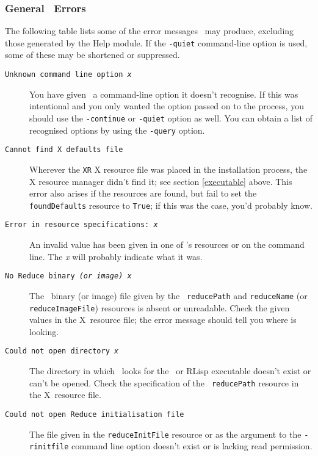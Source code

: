 \subsubsection{General \xr\ Errors}

The following table lists some of the error messages \xr\ may produce,
excluding those generated by the Help module. If the {\tt -quiet}
command-line option is used, some of these may be shortened or
suppressed.

\begin{description}

\item[{\tt Unknown command line option~{\it x\/}}]\hskip 0.6pc\relax
You have given \xr\ a command-line option it doesn't recognise.  If
this was intentional and you only wanted the option passed on to the
\REDUCE{} process, you should use the {\tt -continue} or {\tt -quiet}
option as well.  You can obtain a list of recognised options by using
the {\tt -query} option.

\item[{\tt Cannot find X defaults file}]\hskip 0.6pc\relax Wherever
the {\tt XR} X resource file was placed in the installation process,
the X resource manager didn't find it; see section \ref{executable}
above.  This error also arises if the resources are found, but fail to
set the {\tt foundDefaults} resource to {\tt True}; if this was the
case, you'd probably know.

\item[{\tt Error in resource specifications:~{\it x\/}}]\hskip
0.6pc\relax An invalid value has been given in one of \xr's resources
or on the command line.  The {\it x\/} will probably indicate what it
was.

\item[{\tt No Reduce binary {\it (or {\tt image}) x\/}}]\hskip
0.6pc\relax The \REDUCE\ binary (or image) file given by the {\tt
reducePath} and {\tt reduceName} (or {\tt reduceImageFile}) resources
is absent or unreadable.  Check the given values in the X~resource
file; the error message should tell you where \xr{} is looking.

\item[{\tt Could not open directory~{\it x}}]\hskip 0.6pc\relax The
directory in which \xr\ looks for the \REDUCE\ or RLisp executable
doesn't exist or can't be opened.  Check the specification of the {\tt
reducePath} resource in the X~resource file.

\item[{\tt Could not open Reduce initialisation file}]\hskip
0.6pc\relax The file given in the {\tt reduceInitFile} resource or as
the argument to the {\tt -rinitfile} command line option doesn't exist
or is lacking read permission.


\end{description}

